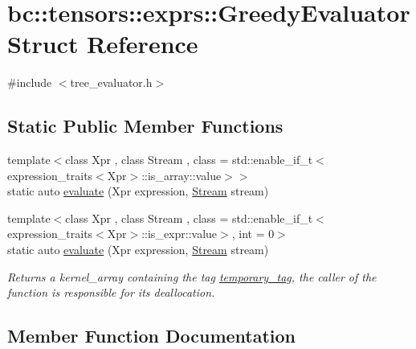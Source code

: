 \hypertarget{structbc_1_1tensors_1_1exprs_1_1GreedyEvaluator}{}\section{bc\+:\+:tensors\+:\+:exprs\+:\+:Greedy\+Evaluator Struct Reference}
\label{structbc_1_1tensors_1_1exprs_1_1GreedyEvaluator}


{\ttfamily \#include $<$tree\+\_\+evaluator.\+h$>$}

\subsection*{Static Public Member Functions}
\begin{DoxyCompactItemize}
\item 
{\footnotesize template$<$class Xpr , class Stream , class  = std\+::enable\+\_\+if\+\_\+t$<$expression\+\_\+traits$<$\+Xpr$>$\+::is\+\_\+array\+::value$>$$>$ }\\static auto \hyperlink{structbc_1_1tensors_1_1exprs_1_1GreedyEvaluator_af36e3e7c9b14bade7ef511d25e9a534f}{evaluate} (Xpr expression, \hyperlink{classbc_1_1streams_1_1Stream}{Stream} stream)
\item 
{\footnotesize template$<$class Xpr , class Stream , class  = std\+::enable\+\_\+if\+\_\+t$<$expression\+\_\+traits$<$\+Xpr$>$\+::is\+\_\+expr\+::value$>$, int  = 0$>$ }\\static auto \hyperlink{structbc_1_1tensors_1_1exprs_1_1GreedyEvaluator_aac54457c2b42be3206a7c666e2acad51}{evaluate} (Xpr expression, \hyperlink{classbc_1_1streams_1_1Stream}{Stream} stream)
\begin{DoxyCompactList}\small\item\em Returns a kernel\+\_\+array containing the tag \hyperlink{structbc_1_1tensors_1_1exprs_1_1temporary__tag}{temporary\+\_\+tag}, the caller of the function is responsible for its deallocation. \end{DoxyCompactList}\end{DoxyCompactItemize}


\subsection{Member Function Documentation}
\mbox{\label{structbc_1_1tensors_1_1exprs_1_1GreedyEvaluator_af36e3e7c9b14bade7ef511d25e9a534f}} 
